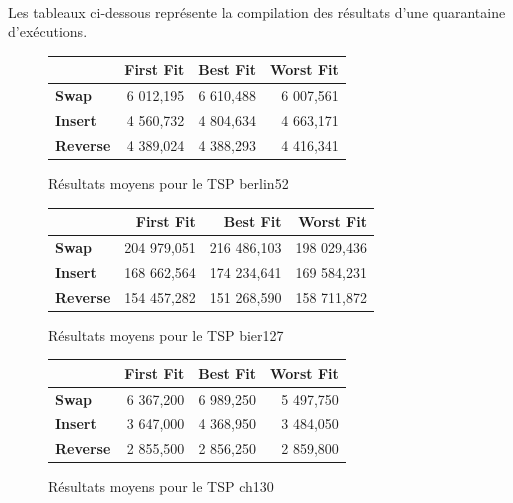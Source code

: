 \documentclass[a4paper,10pt]{report}
\begin{document}
\paragraph{}
  Les tableaux ci-dessous représente la compilation des résultats d'une
quarantaine d'exécutions.

\begin{figure}[h]
  \begin{center}
    \begin{tabular}{|l|r|r|r|}
      \hline
      &		\textbf{First Fit}&	\textbf{Best Fit}&	\textbf{Worst
Fit}\\\hline
      \textbf{Swap}&
	  6 012,195&
	  6 610,488&
	  6 007,561\\\hline
      \textbf{Insert}&
	  4 560,732&
	  4 804,634&
	  4 663,171\\\hline
      \textbf{Reverse}&
	  4 389,024&
	  4 388,293&
	  4 416,341\\\hline
    \end{tabular}
    \caption{Résultats moyens pour le TSP berlin52}
  \end{center}
\end{figure}

\begin{figure}[h]
  \begin{center}
    \begin{tabular}{|l|r|r|r|}
      \hline
      &		\textbf{First Fit}&	\textbf{Best Fit}&	\textbf{Worst
Fit}\\\hline
      \textbf{Swap}&
	  204 979,051&
	  216 486,103&
	  198 029,436\\\hline
      \textbf{Insert}&
	  168 662,564&
	  174 234,641&
	  169 584,231\\\hline
      \textbf{Reverse}&
	  154 457,282&
	  151 268,590&
	  158 711,872\\\hline
    \end{tabular}
    \caption{Résultats moyens pour le TSP bier127}
  \end{center}
\end{figure}

\begin{figure}[h]
  \begin{center}
    \begin{tabular}{|l|r|r|r|}
      \hline
      &		\textbf{First Fit}&	\textbf{Best Fit}&	\textbf{Worst
Fit}\\\hline
      \textbf{Swap}&
	  6 367,200&
	  6 989,250&
	  5 497,750\\\hline
      \textbf{Insert}&
	  3 647,000&
	  4 368,950&
	  3 484,050\\\hline
      \textbf{Reverse}&
	  2 855,500&
	  2 856,250&
	  2 859,800\\\hline
    \end{tabular}
    \caption{Résultats moyens pour le TSP ch130}
  \end{center}
\end{figure}
\end{document}
